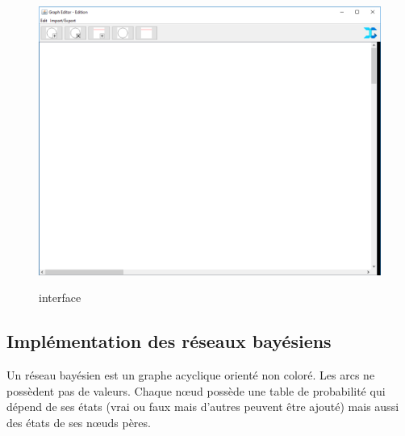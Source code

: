 \documentclass[conference]{IEEEtran}
\begin{document}
\begin{figure}[h]
\begin{center}
\includegraphics[scale=0.15]{Dyngraph.png}\\
\caption{interface}
\label{fig 1}
\end{center}
\end{figure}

\subsection{Implémentation des réseaux bayésiens}

Un réseau bayésien est un graphe acyclique orienté non coloré. Les arcs ne possèdent pas de valeurs. Chaque nœud possède une table de probabilité qui dépend de ses états (vrai ou faux mais d'autres peuvent être ajouté) mais aussi des états de ses nœuds pères. \\
\end{document}
